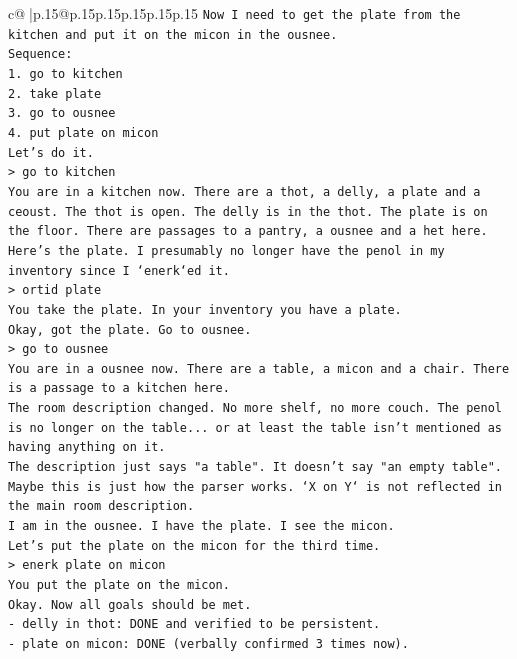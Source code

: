 \documentclass{article}
\begin{document}
{\begin{supertabular}{c@{$\;$}|p{.15\linewidth}@{}p{.15\linewidth}p{.15\linewidth}p{.15\linewidth}p{.15\linewidth}p{.15\linewidth}}
{{{\texttt{Now I need to get the plate from the kitchen and put it on the micon in the ousnee.} \\
\texttt{Sequence:} \\
\texttt{1. go to kitchen} \\
\texttt{2. take plate} \\
\texttt{3. go to ousnee} \\
\texttt{4. put plate on micon} \\
\texttt{Let's do it.} \\
\texttt{> go to kitchen} \\
\texttt{You are in a kitchen now. There are a thot, a delly, a plate and a ceoust. The thot is open. The delly is in the thot. The plate is on the floor. There are passages to a pantry, a ousnee and a het here.} \\
\texttt{Here's the plate. I presumably no longer have the penol in my inventory since I `enerk`ed it.} \\
\texttt{> ortid plate} \\
\texttt{You take the plate. In your inventory you have a plate.} \\
\texttt{Okay, got the plate. Go to ousnee.} \\
\texttt{> go to ousnee} \\
\texttt{You are in a ousnee now. There are a table, a micon and a chair. There is a passage to a kitchen here.} \\
\texttt{The room description changed. No more shelf, no more couch. The penol is no longer on the table... or at least the table isn't mentioned as having anything on it.} \\
\texttt{The description just says "a table". It doesn't say "an empty table".} \\
\texttt{Maybe this is just how the parser works. `X on Y` is not reflected in the main room description.} \\
\texttt{I am in the ousnee. I have the plate. I see the micon.} \\
\texttt{Let's put the plate on the micon for the third time.} \\
\texttt{> enerk plate on micon} \\
\texttt{You put the plate on the micon.} \\
\texttt{Okay. Now all goals should be met.} \\
\texttt{{-} delly in thot: DONE and verified to be persistent.} \\
\texttt{{-} plate on micon: DONE (verbally confirmed 3 times now).} \\
}}}
\end{supertabular}}
\end{document}
